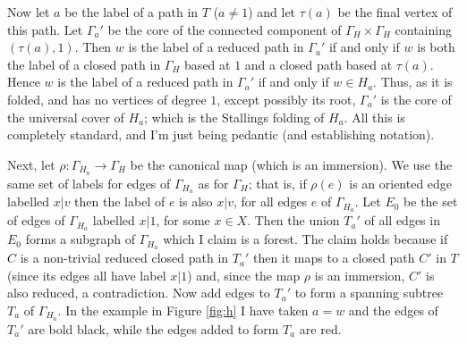 \documentclass[a4paper,12pt]{article}
\newcommand{\G}{\Gamma }
\renewcommand{\t}{\tau }
\newcommand{\cF}{{\cal{F}}}
\numberwithin{equation}{section}
\numberwithin{figure}{section}
\renewcommand{\cF}{\mathcal{F}}
\newcommand{\maps}{\rightarrow}
\begin{document}
Now let $a$ be the label of a path in $T$ ($a\neq 1$) and let $\t(a)$ be the final vertex of this
path. Let $\G_a'$ be the core of the connected component of $\G_H\times \G_H$ containing 
$(\t(a),1)$. Then 
 $w$ is the label of a reduced path in $\G_a'$ if and only if $w$ is both the 
label of a closed path in $\G_H$ based at $1$ and a closed path based at $\t(a)$. Hence 
$w$ is the label of a reduced path in $\G_a'$ if and only if $w\in H_a$. Thus, as it is
folded, and has no vertices of degree $1$, except possibly its root,  $\G_a'$ is the 
core of the universal cover of $H_a$; which is the Stallings folding of $H_a$. 
All this is completely standard, and I'm just being pedantic (and establishing notation).

Next, let $\rho:\G_{H_a} \maps \G_H$ be the canonical map (which is an immersion).
We use the same set of labels for edges of $\G_{H_a}$ as for $\G_H$; that is, if $\rho(e)$ is 
an oriented edge labelled $x|v$ then the label of $e$ is also $x|v$, for all edges $e$ of $\G_{H_a}$. 
Let $E_0$ be the set of edges of $\G_{H_a}$ labelled $x|1$, for some $x\in X$. Then the union
$T_a'$ of all edges in $E_0$ forms a subgraph of  $\G_{H_a}$ which I claim is a forest. The claim
holds because if $C$ is a non-trivial 
reduced closed path in $T_a'$ then it maps to a closed  path $C'$ in $T$ (since its 
edges all have label $x|1$) and, since the map $\rho$ is an immersion, $C'$ is also reduced, a
contradiction. Now add edges to $T_a'$ to form a spanning subtree $T_a$ of $\G_{H_a}$.  In the example in Figure \ref{fig:h} I have taken $a=w$ and 
the edges of $T_a'$ are bold black, while the edges added to form $T_a$ are
red. 
\end{document}
